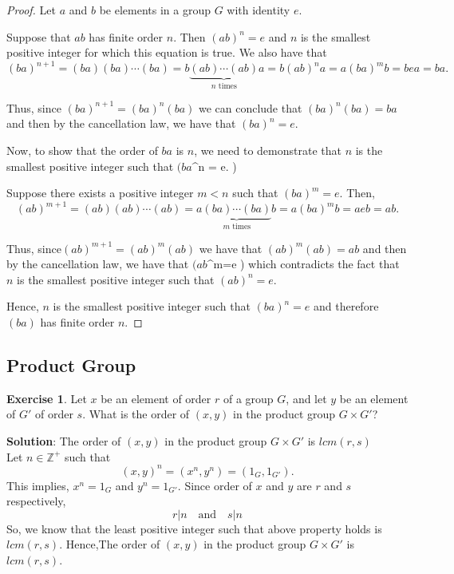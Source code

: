 \documentclass[
]{book}
\theoremstyle{definition}
\theoremstyle{definition}
\theoremstyle{definition}
\newtheorem{exercise}{Exercise}[chapter]
\theoremstyle{definition}
\theoremstyle{remark}
\begin{document}
\begin{proof}
Let \(a\) and \(b\) be elements in a group \(G\) with identity \(e\).

Suppose that \(ab\) has finite order \(n\). Then \((ab)^n = e\) and \(n\) is the smallest positive integer for which this equation is true. We also have that \[ (ba)^{n+1} = (ba)(ba) \cdots (ba) = b\underbrace{(ab) \cdots (ab)}_{n \text{ times}}a =b(ab)^na=a(ba)^m b =bea = ba. \]

Thus, since \((ba)^{n+1} = (ba)^n(ba)\) we can conclude that \((ba)^n(ba) = ba\) and then by the cancellation law, we have that \((ba)^n = e.\)

Now, to show that the order of \(ba\) is \(n\), we need to demonstrate that \(n\) is the smallest positive integer such that \((ba\)\^{}n = e. )

Suppose there exists a positive integer \(m < n\) such that \((ba)^m = e.\)
Then,\[
(ab)^{m+1} =(ab)(ab)\cdots(ab)=a\underbrace{(ba)\cdots(ba)}_{m \text{ times}}b=a(ba)^m b=aeb= ab.
\]

Thus, since\((ab)^{m+1} =(ab)^m(ab)\)
we have that
\((ab)^m(ab)= ab\)
and then by the cancellation law, we have that
\((ab\)\^{}m=e )
which contradicts the fact that \(n\) is the smallest positive integer such that
\((ab)^n=e.\)

Hence, \(n\) is the smallest positive integer such that
\((ba)^n=e\)
and therefore
\((ba)\) has finite order \(n\).
\end{proof}

\hypertarget{product-group}{%
\subsection{Product Group}\label{product-group}}

\begin{exercise}
\protect\hypertarget{exr:unnamed-chunk-60}{}\label{exr:unnamed-chunk-60}Let \(x\) be an element of order \(r\) of a group \(G\), and let \(y\) be an element of \(G'\) of order \(s\). What is the order of \((x, y)\) in the product group \(G \times G'\)?
\end{exercise}

\textbf{Solution}: The order of \((x, y)\) in the product group \(G \times G'\) is \textbf{\(lcm(r,s)\)}\\
Let \(n\in \mathbb{Z}^+\) such that \[(x,y)^n=(x^n,y^n)=(1_G,1_{G'}).\]
This implies, \(x^n=1_G\) and \(y^n=1_{G'}\). Since order of \(x\) and \(y\) are \(r\) and \(s\) respectively,
\[r|n~~~\text{ and }~~~s|n\]
So, we know that the least positive integer such that above property holds is \(lcm(r,s)\). Hence,The order of \((x, y)\) in the product group \(G \times G'\) is \textbf{\(lcm(r,s)\)}.
\end{document}
